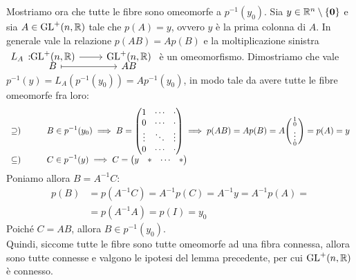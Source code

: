 \begin{demonstration}
	Mostriamo ora che tutte le fibre sono omeomorfe a $p^{-1}(y_0)$. Sia $y\in\mathbb{R}^n\setminus\{\mathbf{0}\}$ e sia $A\in\operatorname{GL}^+(n,\mathbb{R})$ tale che $p(A)=y$, ovvero $y$ è la prima colonna di $A$. In generale vale la relazione $p(AB)=Ap(B)$ e la moltiplicazione sinistra $\displaystyle \funztot {L_A} {\gl^+(n,\realset)} {\gl^+(n,\realset)} B {AB}$ è un omeomorfismo. Dimostriamo che vale $p^{-1}(y)=L_A\left( p^{-1}(y_0)\right)=Ap^{-1}(y_0)$, in modo tale da avere tutte le fibre omeomorfe fra loro:
	\begin{equation*}
		\begin{array}{ll}
			\supseteq)\quad & \displaystyle \quad B\in p^{-1}(y_0) \implies B=\begin{pmatrix}
				1	   & \cdots  & \cdot  \\
				0 	   & \cdots  & \cdot   \\
				\vdots & \ddots  & \vdots   \\
				0      & \cdots  & \cdot
			\end{pmatrix} \implies	p(AB)=Ap(B)=A\begin{psmallmatrix}
				1 \\ 0 \\ \vdots \\ 0
			\end{psmallmatrix}= p(A)=y\\
			\subseteq)\quad & \displaystyle \quad C\in p^{-1}(y) \implies C=\begin{pmatrix}
				y & * & \cdots & *
			\end{pmatrix}
		\end{array}
	\end{equation*}
Poniamo allora $B=A^{-1}C$:
			\begin{equation*}
				\begin{array}{ll}
					p(B)&=p(A^{-1}C)=A^{-1}p(C)=A^{-1}y=A^{-1}p(A)=\\
					&=p(A^{-1}A)=p(I)=y_0
				\end{array}
			\end{equation*}
	Poiché $C=AB$, allora $B\in p^{-1}(y_0)$.\\
	Quindi, siccome tutte le fibre sono tutte omeomorfe ad una fibra connessa, allora sono tutte connesse e valgono le ipotesi del lemma precedente, per cui $\operatorname{GL}^+(n,\mathbb{R})$ è connesso.
\end{demonstration}
\begin{corollary}
\end{corollary}
